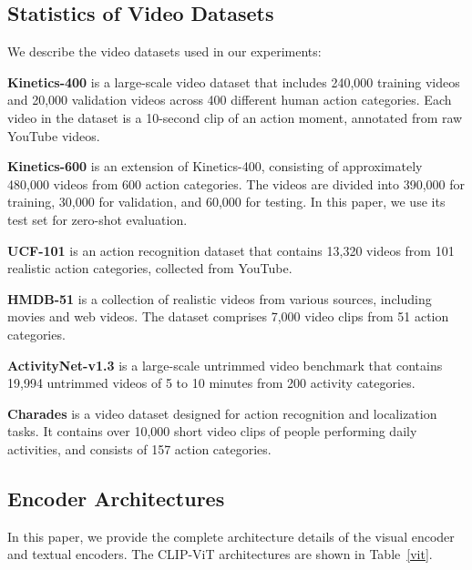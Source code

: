 \documentclass[10pt,twocolumn,letterpaper]{article}
\begin{document}
\subsection{Statistics of Video Datasets}\label{sec:video_datasets}
We describe the video datasets used in our experiments:

\noindent\textbf{Kinetics-400} is a large-scale video dataset that includes 240,000 training videos and 20,000 validation videos across 400 different human action categories. Each video in the dataset is a 10-second clip of an action moment, annotated from raw YouTube videos.

\noindent\textbf{Kinetics-600} is an extension of Kinetics-400, consisting of approximately 480,000 videos from 600 action categories. The videos are divided into 390,000 for training, 30,000 for validation, and 60,000 for testing. In this paper, we use its test set for zero-shot evaluation.

\noindent\textbf{UCF-101} is an action recognition dataset that contains 13,320 videos from 101 realistic action categories, collected from YouTube.

\noindent\textbf{HMDB-51} is a collection of realistic videos from various sources, including movies and web videos. The dataset comprises 7,000 video clips from 51 action categories.

\noindent\textbf{ActivityNet-v1.3} is a large-scale untrimmed video benchmark that contains 19,994 untrimmed videos of 5 to 10 minutes from 200 activity categories.

\noindent\textbf{Charades} is a video dataset designed for action recognition and localization tasks. It contains over 10,000 short video clips of people performing daily activities, and consists of 157 action categories.








\subsection{Encoder Architectures}\label{sec:vis_encoder}
In this paper, we provide the complete architecture details of the visual encoder and textual encoders. The CLIP-ViT architectures are shown in Table~\ref{vit}.
\end{document}
